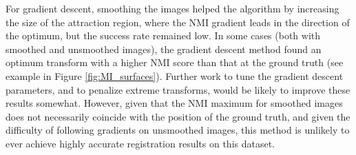 \documentclass{report}
\begin{document}
For gradient descent, smoothing the images helped the algorithm by increasing the size of the attraction region, where the NMI gradient leads in the direction of the optimum, but the success rate remained low. In some cases (both with smoothed and unsmoothed images), the gradient descent method found an optimum transform with a higher NMI score than that at the ground truth (see example in Figure \ref{fig:MI_surfaces}). Further work to tune the gradient descent parameters, and to penalize extreme transforms, would be likely to improve these results somewhat. However, given that the NMI maximum for smoothed images does not necessarily coincide with the position of the ground truth, and given the difficulty of following gradients on unsmoothed images, this method is unlikely to ever achieve highly accurate registration results on this dataset.
\end{document}
